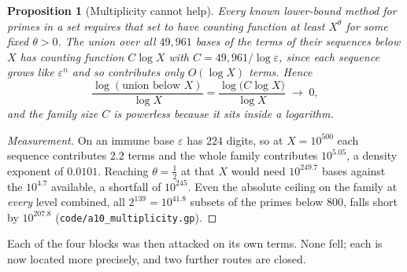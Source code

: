 \documentclass[11pt]{article}
\newtheorem{proposition}[theorem]{Proposition}
\theoremstyle{definition}
\begin{document}
\begin{proposition}[Multiplicity cannot help]\label{prop:multiplicityfail}
Every known lower-bound method for primes in a set requires that set to have counting function at
least $X^{\theta}$ for some fixed $\theta>0$. The union over all $49{,}961$ bases of the terms of
their sequences below $X$ has counting function $C\log X$ with $C=49{,}961/\log\varepsilon$, since
each sequence grows like $\varepsilon^n$ and so contributes only $O(\log X)$ terms. Hence
\[ \frac{\log(\text{union below }X)}{\log X}=\frac{\log\bigl(C\log X\bigr)}{\log X}\;\longrightarrow\;0, \]
and the family size $C$ is powerless because it sits inside a logarithm.
\end{proposition}
\begin{proof}[Measurement]
On an immune base $\varepsilon$ has $224$ digits, so at $X=10^{500}$ each sequence contributes
$2.2$ terms and the whole family contributes $10^{5.05}$, a density exponent of $0.0101$. Reaching
$\theta=\tfrac12$ at that $X$ would need $10^{249.7}$ bases against the $10^{4.7}$ available, a
shortfall of $10^{245}$. Even the absolute ceiling on the family at \emph{every} level combined,
all $2^{139}=10^{41.8}$ subsets of the primes below $800$, falls short by $10^{207.8}$
\textup{(\texttt{code/a10\_multiplicity.gp})}.
\end{proof}

Each of the four blocks was then attacked on its own terms. None fell; each is now located more
precisely, and two further routes are closed.
\end{document}
